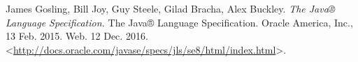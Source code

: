 \begin{thebibliography}{21}

James Gosling, Bill Joy, Guy Steele, Gilad Bracha, Alex Buckley. \textit{The Java® Language Specification.} The Java® Language Specification. Oracle America, Inc., 13 Feb. 2015. Web. 12 Dec. 2016. <\url{http://docs.oracle.com/javase/specs/jls/se8/html/index.html}>.





\end{thebibliography}
